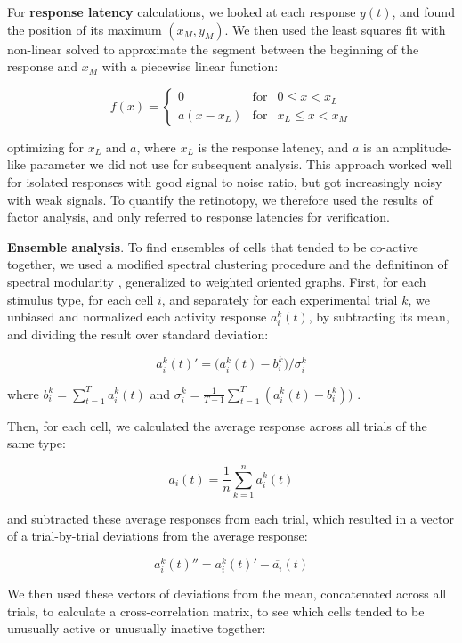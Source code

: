 \documentclass{article}
\begin{document}
For \textbf{response latency} calculations, we looked at each response $y(t)$, and found the position of its maximum $(x_M, y_M)$. We then used the least squares fit with non-linear solved to approximate the segment between the beginning of the response and $x_M$ with a piecewise linear function:

\[ f(x) = \left \{ \begin{array}{cll} 0 & \text{for} & 0 \leqslant x<x_L \\
a (x-x_L) & \text{for} & x_L\leqslant x < x_M \end{array} \right. \]

optimizing for $x_L$ and $a$, where $x_L$ is the response latency, and $a$ is an amplitude-like parameter we did not use for subsequent analysis. This approach worked well for isolated responses with good signal to noise ratio, but got increasingly noisy with weak signals. To quantify the retinotopy, we therefore used the results of factor analysis, and only referred to response latencies for verification.

\textbf{Ensemble analysis}. To find ensembles of cells that tended to be co-active together, we used a modified spectral clustering procedure \citep{ng2002spectral} and the definitinon of spectral modularity \citep{newman2006modularity}, generalized to weighted oriented graphs. First, for each stimulus type, for each cell $i$, and separately for each experimental trial $k$, we unbiased and normalized each activity response $a^k_i(t)$, by subtracting its mean, and dividing the result over standard deviation:

\[ a^k_i(t)' = \big(a^k_i(t)-b^k_i\big)/\sigma^k_i \]

where $b^k_i = \sum_{t=1}^T{a^k_i(t)}$ and $\sigma^k_i = \frac{1}{T-1}\sum_{t=1}^T{(a^k_i(t) - b^k_i))}$ .

Then, for each cell, we calculated the average response across all trials of the same type: 

\[ \overline{a_i}(t) = \frac{1}{n}\sum_{k=1}^n{a^k_i(t)} \]

and subtracted these average responses from each trial, which resulted in a vector of a trial-by-trial deviations from the average response:

\[ a^k_i(t)'' = a^k_i(t)' - \overline{a_i}(t) \]

We then used these vectors of deviations from the mean, concatenated across all trials, to calculate a cross-correlation matrix, to see which cells tended to be unusually active or unusually inactive together:
\end{document}
